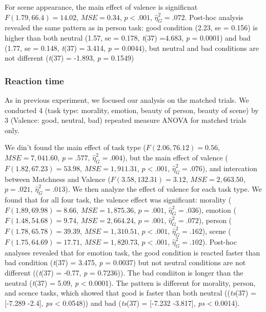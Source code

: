 \documentclass[man]{apa6}
\begin{document}
For scene appearance, the main effect of valence is significnat \(F(1.79, 66.4) = 14.02\), \(\mathit{MSE} = 0.34\), \(p < .001\), \(\hat{\eta}^2_G = .072\). Post-hoc analysis revealed the same pattern as in person task: good condition (2.23, se = 0.156) is higher than both neutral (1.57, se = 0.178, \emph{t}(37) =4.683, \emph{p} = 0.0001) and bad (1.77, se = 0.148, \emph{t}(37) = 3.414, \emph{p} = 0.0044), but neutral and bad conditions are not different (\emph{t}(37) = -1.893, \emph{p} = 0.1549)

\hypertarget{reaction-time-5}{%
\subsubsection{Reaction time}\label{reaction-time-5}}

As in previous experiment, we focused our analysis on the matched trials. We conducted 4 (task type: morality, emotion, beauty of person, beauty of scene) by 3 (Valence: good, neutral, bad) repeated measure ANOVA for matched trials only.

We din't found the main effect of task type (\(F(2.06, 76.12) = 0.56\), \(\mathit{MSE} = 7,041.60\), \(p = .577\), \(\hat{\eta}^2_G = .004\)), but the main effect of valence (\(F(1.82, 67.23) = 53.98\), \(\mathit{MSE} = 1,911.31\), \(p < .001\), \(\hat{\eta}^2_G = .076\)), and intercation between Matchness and Valence (\(F(3.58, 132.31) = 3.12\), \(\mathit{MSE} = 2,663.50\), \(p = .021\), \(\hat{\eta}^2_G = .013\)). We then analyze the effect of valence for each task type. We found that for all four task, the valence effect was significant: morality (\(F(1.89, 69.98) = 8.66\), \(\mathit{MSE} = 1,875.36\), \(p = .001\), \(\hat{\eta}^2_G = .036\)), emotion (\(F(1.48, 54.68) = 9.74\), \(\mathit{MSE} = 2,664.24\), \(p = .001\), \(\hat{\eta}^2_G = .072\)), person (\(F(1.78, 65.78) = 39.39\), \(\mathit{MSE} = 1,310.51\), \(p < .001\), \(\hat{\eta}^2_G = .162\)), scene (\(F(1.75, 64.69) = 17.71\), \(\mathit{MSE} = 1,820.73\), \(p < .001\), \(\hat{\eta}^2_G = .102\)). Post-hoc analyses revealed that for emotion task, the good condition is reacted faster than bad condition (\emph{t}(37) = 3.475, \emph{p} = 0.0037) but not neutral conditions are not different ((\emph{t}(37) = -0.77, \emph{p} = 0.7236)). The bad condiiton is longer than the neutral (\emph{t}(37) = 5.09, \emph{p} \textless{} 0.0001). The pattern is different for morality, person, and scence tasks, which showed that good is faster than both neutral ((\emph{ts}(37) = {[}-7.289 -2.4{]}, \emph{ps} \textless{} 0.0548)) and bad (\emph{ts}(37) = {[}-7.232 -3.817{]}, \emph{ps} \textless{} 0.0014).
\end{document}
